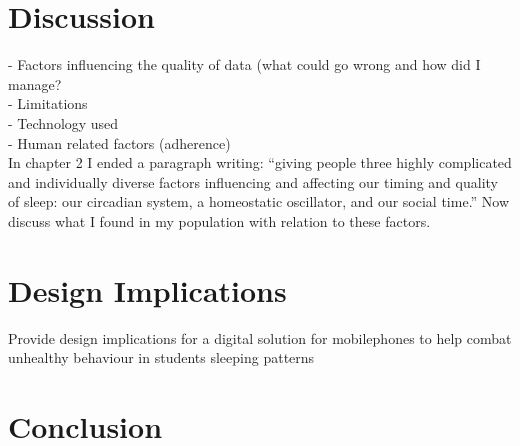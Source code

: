 \documentclass[12pt]{article} %
\begin{document}



\section{Discussion}
- Factors influencing the quality of data (what could go wrong and how did I manage?\\
- Limitations\\
- Technology used\\
- Human related factors (adherence)\\

In chapter 2 I ended a paragraph writing: ``giving people three highly complicated and individually diverse factors influencing and affecting our timing and quality of sleep: our circadian system, a homeostatic oscillator, and our social time.'' Now discuss what I found in my population with relation to these factors.

\section{Design Implications}
Provide design implications for a digital solution for mobilephones to help combat unhealthy behaviour in students sleeping patterns

\section{Conclusion}
\end{document}
